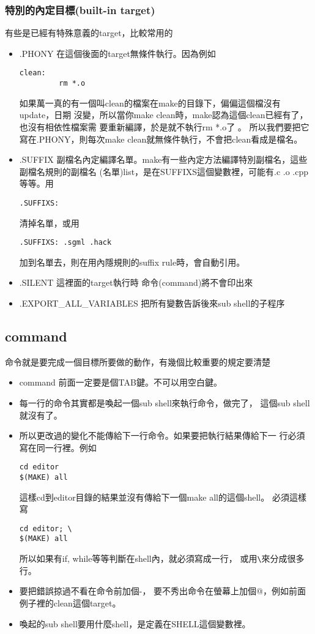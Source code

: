  \subsubsection{特別的內定目標(built-in target)}
  有些是已經有特殊意義的target，比較常用的
  \begin{itemize}
    \item .PHONY 在這個後面的target無條件執行。因為例如
      \begin{verbatim}
clean:
         rm *.o
      \end{verbatim}
      如果萬一真的有一個叫clean的檔案在make的目錄下，偏偏這個檔沒有update，日期
      沒變，所以當你make clean時，make認為這個clean已經有了，也沒有相依性檔案需
      要重新編譯，於是就不執行rm *.o了 。 所以我們要把它寫在.PHONY，則每次make
      clean就無條件執行，不會把clean看成是檔名。
    \item .SUFFIX 副檔名內定編譯名單。make有一些內定方法編譯特別副檔名，這些
      副檔名規則的副檔名 (名單)list，是在SUFFIXS這個變數裡，可能有.c .o .cpp
      等等。用
      \begin{verbatim}
.SUFFIXS:
      \end{verbatim}
      清掉名單，或用
      \begin{verbatim}
.SUFFIXS: .sgml .hack  
      \end{verbatim}
      加到名單去，則在用內隱規則的suffix rule時，會自動引用。
    \item .SILENT 這裡面的target執行時 命令(command)將不會印出來
    \item .EXPORT\_ALL\_VARIABLES 把所有變數告訴後來sub shell的子程序
  \end{itemize}

  \subsection{command}
  命令就是要完成一個目標所要做的動作，有幾個比較重要的規定要清楚
  \begin{itemize}
    \item command 前面一定要是個TAB鍵。不可以用空白鍵。
    \item 每一行的命令其實都是喚起一個sub shell來執行命令，做完了，
          這個sub shell就沒有了。
    \item 所以更改過的變化不能傳給下一行命令。如果要把執行結果傳給下一
          行必須寫在同一行裡。例如
          \begin{verbatim}     
cd editor
$(MAKE) all
          \end{verbatim}     
          這樣cd到editor目錄的結果並沒有傳給下一個make all的這個shell。
          必須這樣寫
          \begin{verbatim}     
cd editor; \
$(MAKE) all
          \end{verbatim}     
          所以如果有if, while等等判斷在shell內，就必須寫成一行，
          或用\verb=\=來分成很多行。
    \item 要把錯誤掠過不看在命令前加個-，
          要不秀出命令在螢幕上加個@，例如前面例子裡的clean這個target。
    \item 喚起的sub shell要用什麼shell，是定義在SHELL這個變數裡。
  \end{itemize}

